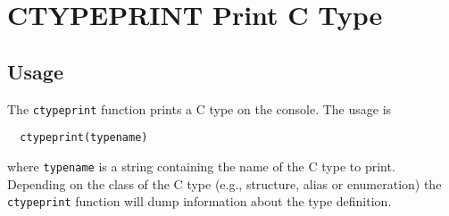 \section{CTYPEPRINT Print C Type}

\subsection{Usage}

The \verb|ctypeprint| function prints a C type on the console.  The 
usage is
\begin{verbatim}
  ctypeprint(typename)
\end{verbatim}
where \verb|typename| is a string containing the name of the C type to print.
Depending on the class of the C type (e.g., structure, alias or enumeration)
the \verb|ctypeprint| function will dump information about the type definition.
